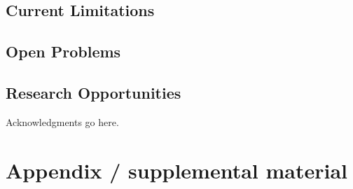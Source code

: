 \documentclass{article}
\begin{document}
\subsection{Current Limitations}
\subsection{Open Problems}
\subsection{Research Opportunities}

\begin{ack}
Acknowledgments go here.
\end{ack}

\small





\appendix

\section{Appendix / supplemental material}


\newpage
\end{document}

